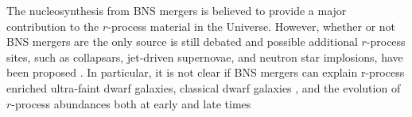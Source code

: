The nucleosynthesis from BNS mergers is believed to provide a major
contribution to the $r$-process material in the Universe.
However, whether or not BNS mergers are the only source is still debated and 
possible additional $r$-process sites, such as collapsars, 
jet-driven supernovae, and neutron star implosions, have been proposed
\citep{Argast:2003he,Duan:2010af,Winteler:2012hu,Nishimura:2015nca,Hirai:2015npa,Bramante:2016mzo,Nishimura:2016hak,Fuller:2017uyd,Mosta:2017geb,Siegel:2018zxq,Ji:2019ssk,Bartos:2019twj,vandeVoort:2019bxg,Wehmeyer:2019ovu,Vassh:2019cey}.
In particular, it is not clear if BNS mergers can explain r-process enriched ultra-faint dwarf galaxies,
classical dwarf galaxies \citep{Ji:2015wzg,Bramante:2016mzo,Safarzadeh:2018ent,Safarzadeh:2018fdy,Skuladottir:2019bjz,Bonetti:2019fxj}, 
and the evolution of $r$-process abundances both at early and late times \citep{Safarzadeh:2017riw,Safarzadeh:2018ent,Bonetti:2018nwo,Cote:2018qku,Hotokezaka:2018aui,Banerjee:2020eak}


